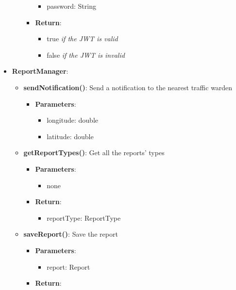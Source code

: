 \documentclass{article}
\begin{document}
\begin{itemize}
\begin{itemize}
\begin{itemize}
\begin{itemize}
							\item password: String
						\end{itemize}
					\item \textbf{Return}:
						\begin{itemize}
							\item true \textit{if the JWT is valid}
							\item false \textit{if the JWT is invalid}
						\end{itemize}
				\end{itemize}
		\end{itemize}
	\item \textbf{ReportManager}:
		\begin{itemize}
			\item \textbf{sendNotification()}:
				Send a notification to the nearest traffic warden
				\begin{itemize}
					\item \textbf{Parameters}:
						\begin{itemize}
							\item longitude: double
							\item latitude: double
						\end{itemize}
				\end{itemize}
			\item \textbf{getReportTypes()}:
				Get all the reports' types
				\begin{itemize}
					\item \textbf{Parameters}:
						\begin{itemize}
							\item none
						\end{itemize}
					\item \textbf{Return}:
						\begin{itemize}
							\item reportType: \textlangle{}ReportType\textrangle{}
						\end{itemize}
				\end{itemize}
			\item \textbf{saveReport()}:
				Save the report 
			\begin{itemize}
				\item \textbf{Parameters}:
					\begin{itemize}
						\item report: Report
					\end{itemize}
				\item \textbf{Return}:
					\begin{itemize}

\end{itemize}
\end{itemize}
\end{itemize}
\end{itemize}
\end{document}

